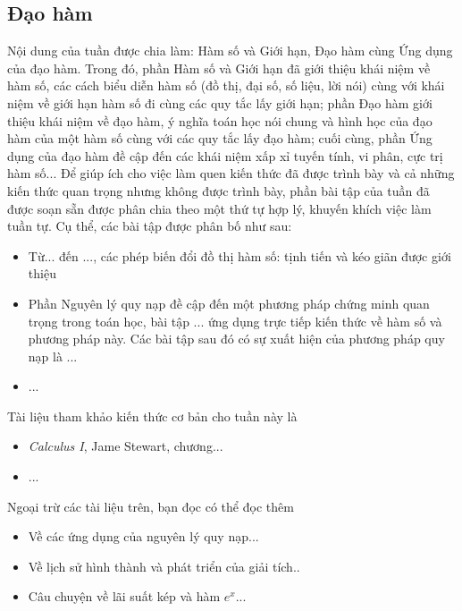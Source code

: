 \documentclass[a4paper,12pt]{book}
\begin{document}
\subsection{Đạo hàm}

\newpage
Nội dung của tuần được chia làm: Hàm số và Giới hạn, Đạo hàm cùng Ứng dụng của đạo hàm. Trong đó, phần Hàm số và Giới hạn đã giới thiệu khái niệm về hàm số, các cách biểu diễn hàm số (đồ thị, đại số, số liệu, lời nói) cùng với khái niệm về giới hạn hàm số đi cùng các quy tắc lấy giới hạn; phần Đạo hàm giới thiệu khái niệm về đạo hàm, ý nghĩa toán học nói chung và hình học của đạo hàm của một hàm số cùng với các quy tắc lấy đạo hàm; cuối cùng, phần Ứng dụng của đạo hàm đề cập đến các khái niệm xấp xỉ tuyến tính, vi phân, cực trị hàm số...
\vspace{5mm}
Để giúp ích cho việc làm quen kiến thức đã được trình bày và cả những kiến thức quan trọng nhưng không được trình bày, phần bài tập của tuần đã được soạn sẵn được phân chia theo một thứ tự hợp lý, khuyến khích việc làm tuần tự. Cụ thể, các bài tập được phân bố như sau:
\begin{itemize}
    \item Từ... đến ..., các phép biến đổi đồ thị hàm số: tịnh tiến và kéo giãn được giới thiệu
    \item Phần Nguyên lý quy nạp đề cập đến một phương pháp chứng minh quan trọng trong toán học, bài tập ... ứng dụng trực tiếp kiến thức về hàm số và phương pháp này. Các bài tập sau đó có sự xuất hiện của phương pháp quy nạp là ...
    \item ...
\end{itemize}
Tài liệu tham khảo kiến thức cơ bản cho tuần này là
\begin{itemize}
    \item \emph{Calculus I}, Jame Stewart, chương...
    \item ...
\end{itemize}
Ngoại trừ các tài liệu trên, bạn đọc có thể đọc thêm 
\begin{itemize}
    \item Về các ứng dụng của nguyên lý quy nạp...
    \item Về lịch sử hình thành và phát triển của giải tích..
    \item Câu chuyện về lãi suất kép và hàm $e^x$...
\end{itemize}
\end{document}
